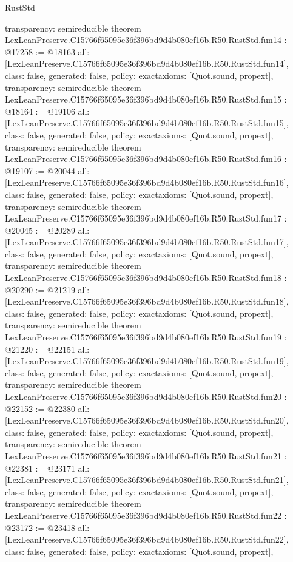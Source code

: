 \begin{lexlean}{RustStd}
\begin{coremodule}
{  transparency: semireducible
}
theorem LexLeanPreserve.C15766f65095e36f396bd9d4b080ef16b.R50.RustStd.fun14 : @17258 := @18163 {
  all: [LexLeanPreserve.C15766f65095e36f396bd9d4b080ef16b.R50.RustStd.fun14],
  class: false,
  generated: false,
  policy: exact{axioms: [Quot.sound, propext]},
  transparency: semireducible
}
theorem LexLeanPreserve.C15766f65095e36f396bd9d4b080ef16b.R50.RustStd.fun15 : @18164 := @19106 {
  all: [LexLeanPreserve.C15766f65095e36f396bd9d4b080ef16b.R50.RustStd.fun15],
  class: false,
  generated: false,
  policy: exact{axioms: [Quot.sound, propext]},
  transparency: semireducible
}
theorem LexLeanPreserve.C15766f65095e36f396bd9d4b080ef16b.R50.RustStd.fun16 : @19107 := @20044 {
  all: [LexLeanPreserve.C15766f65095e36f396bd9d4b080ef16b.R50.RustStd.fun16],
  class: false,
  generated: false,
  policy: exact{axioms: [Quot.sound, propext]},
  transparency: semireducible
}
theorem LexLeanPreserve.C15766f65095e36f396bd9d4b080ef16b.R50.RustStd.fun17 : @20045 := @20289 {
  all: [LexLeanPreserve.C15766f65095e36f396bd9d4b080ef16b.R50.RustStd.fun17],
  class: false,
  generated: false,
  policy: exact{axioms: [Quot.sound, propext]},
  transparency: semireducible
}
theorem LexLeanPreserve.C15766f65095e36f396bd9d4b080ef16b.R50.RustStd.fun18 : @20290 := @21219 {
  all: [LexLeanPreserve.C15766f65095e36f396bd9d4b080ef16b.R50.RustStd.fun18],
  class: false,
  generated: false,
  policy: exact{axioms: [Quot.sound, propext]},
  transparency: semireducible
}
theorem LexLeanPreserve.C15766f65095e36f396bd9d4b080ef16b.R50.RustStd.fun19 : @21220 := @22151 {
  all: [LexLeanPreserve.C15766f65095e36f396bd9d4b080ef16b.R50.RustStd.fun19],
  class: false,
  generated: false,
  policy: exact{axioms: [Quot.sound, propext]},
  transparency: semireducible
}
theorem LexLeanPreserve.C15766f65095e36f396bd9d4b080ef16b.R50.RustStd.fun20 : @22152 := @22380 {
  all: [LexLeanPreserve.C15766f65095e36f396bd9d4b080ef16b.R50.RustStd.fun20],
  class: false,
  generated: false,
  policy: exact{axioms: [Quot.sound, propext]},
  transparency: semireducible
}
theorem LexLeanPreserve.C15766f65095e36f396bd9d4b080ef16b.R50.RustStd.fun21 : @22381 := @23171 {
  all: [LexLeanPreserve.C15766f65095e36f396bd9d4b080ef16b.R50.RustStd.fun21],
  class: false,
  generated: false,
  policy: exact{axioms: [Quot.sound, propext]},
  transparency: semireducible
}
theorem LexLeanPreserve.C15766f65095e36f396bd9d4b080ef16b.R50.RustStd.fun22 : @23172 := @23418 {
  all: [LexLeanPreserve.C15766f65095e36f396bd9d4b080ef16b.R50.RustStd.fun22],
  class: false,
  generated: false,
  policy: exact{axioms: [Quot.sound, propext]},
}
\end{coremodule}
\end{lexlean}
